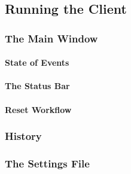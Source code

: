 \subsection{Running the Client}

\subsubsection{The Main Window}

\paragraph{State of Events}

\paragraph{The Status Bar}

\paragraph{Reset Workflow}

\subsubsection{History}

\subsubsection{The Settings File}